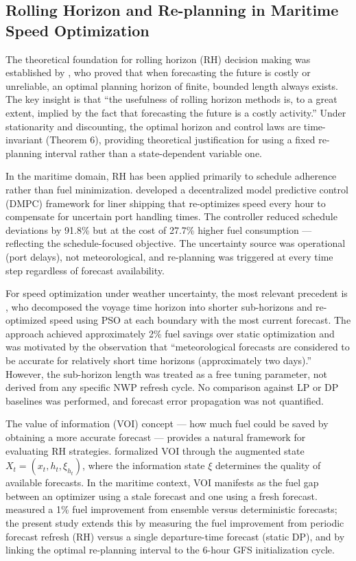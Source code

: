 \documentclass[review,authoryear]{elsarticle}  %
\begin{document}
\subsection{Rolling Horizon and Re-planning in Maritime Speed Optimization}
\label{sec:lit-rh}

The theoretical foundation for rolling horizon (RH) decision making was established by \citet{Sethi1991}, who proved that when forecasting the future is costly or unreliable, an optimal planning horizon of finite, bounded length always exists. The key insight is that ``the usefulness of rolling horizon methods is, to a great extent, implied by the fact that forecasting the future is a costly activity.'' Under stationarity and discounting, the optimal horizon and control laws are time-invariant (Theorem 6), providing theoretical justification for using a fixed re-planning interval rather than a state-dependent variable one.

In the maritime domain, RH has been applied primarily to schedule adherence rather than fuel minimization. \citet{Zheng2023} developed a decentralized model predictive control (DMPC) framework for liner shipping that re-optimizes speed every hour to compensate for uncertain port handling times. The controller reduced schedule deviations by 91.8\% but at the cost of 27.7\% higher fuel consumption --- reflecting the schedule-focused objective. The uncertainty source was operational (port delays), not meteorological, and re-planning was triggered at every time step regardless of forecast availability.

For speed optimization under weather uncertainty, the most relevant precedent is \citet{Tzortzis2021}, who decomposed the voyage time horizon into shorter sub-horizons and re-optimized speed using PSO at each boundary with the most current forecast. The approach achieved approximately 2\% fuel savings over static optimization and was motivated by the observation that ``meteorological forecasts are considered to be accurate for relatively short time horizons (approximately two days).'' However, the sub-horizon length was treated as a free tuning parameter, not derived from any specific NWP refresh cycle. No comparison against LP or DP baselines was performed, and forecast error propagation was not quantified.

The value of information (VOI) concept --- how much fuel could be saved by obtaining a more accurate forecast --- provides a natural framework for evaluating RH strategies. \citet{Sethi1991} formalized VOI through the augmented state $X_t = (x_t, h_t, \xi_{h_t})$, where the information state $\xi$ determines the quality of available forecasts. In the maritime context, VOI manifests as the fuel gap between an optimizer using a stale forecast and one using a fresh forecast. \citet{Luo2023} measured a 1\% fuel improvement from ensemble versus deterministic forecasts; the present study extends this by measuring the fuel improvement from periodic forecast refresh (RH) versus a single departure-time forecast (static DP), and by linking the optimal re-planning interval to the 6-hour GFS initialization cycle.
\end{document}
